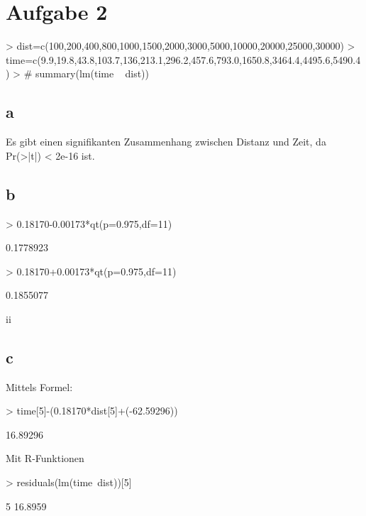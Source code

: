 
\section{Aufgabe 2}
\begin{Schunk}
\begin{Sinput}
> dist=c(100,200,400,800,1000,1500,2000,3000,5000,10000,20000,25000,30000)
> time=c(9.9,19.8,43.8,103.7,136,213.1,296.2,457.6,793.0,1650.8,3464.4,4495.6,5490.4)
> # summary(lm(time ~ dist))
\end{Sinput}
\end{Schunk}

\subsection{a}
Es gibt einen signifikanten Zusammenhang zwischen Distanz und Zeit, 
da Pr(>|t|) < 2e-16 ist. 

\subsection{b}
\begin{Schunk}
\begin{Sinput}
> 0.18170-0.00173*qt(p=0.975,df=11)
\end{Sinput}
\begin{Soutput}
[1] 0.1778923
\end{Soutput}
\begin{Sinput}
> 0.18170+0.00173*qt(p=0.975,df=11)
\end{Sinput}
\begin{Soutput}
[1] 0.1855077
\end{Soutput}
\end{Schunk}
ii

\subsection{c}
Mittels Formel: 
\begin{Schunk}
\begin{Sinput}
> time[5]-(0.18170*dist[5]+(-62.59296))
\end{Sinput}
\begin{Soutput}
[1] 16.89296
\end{Soutput}
\end{Schunk}
Mit R-Funktionen
\begin{Schunk}
\begin{Sinput}
> residuals(lm(time~dist))[5]
\end{Sinput}
\begin{Soutput}
      5 
16.8959 
\end{Soutput}
\end{Schunk}

